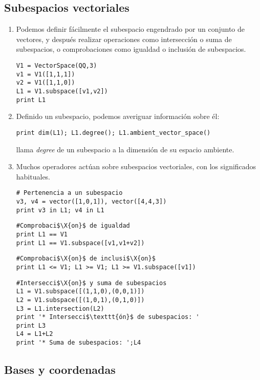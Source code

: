 \subsection{Subespacios vectoriales}\label{b3s3:index-2}
\begin{enumerate}
\item Podemos definir fácilmente el subespacio engendrado por un conjunto de
vectores, y después realizar operaciones como intersección o suma de
subespacios, o
comprobaciones como igualdad o inclusión de subespacios. 
\begin{lstlisting}
V1 = VectorSpace(QQ,3)
v1 = V1([1,1,1])
v2 = V1([1,1,0])
L1 = V1.subspace([v1,v2])
print L1
\end{lstlisting}


\item Definido un subespacio, podemos averiguar información sobre él:
\begin{lstlisting}
print dim(L1); L1.degree(); L1.ambient_vector_space()
\end{lstlisting}

{\sage} llama {\itshape degree} de un subespacio a la dimensi\'on de su espacio
ambiente.

\item Muchos operadores actúan sobre subespacios vectoriales, con los
significados
habituales.
\begin{lstlisting}
# Pertenencia a un subespacio
v3, v4 = vector([1,0,1]), vector([4,4,3])
print v3 in L1; v4 in L1
\end{lstlisting}

\begin{lstlisting}
#Comprobaci$\X{on}$ de igualdad
print L1 == V1
print L1 == V1.subspace([v1,v1+v2]) 
\end{lstlisting}

\begin{lstlisting}
#Comprobaci$\X{on}$ de inclusi$\X{on}$
print L1 <= V1; L1 >= V1; L1 >= V1.subspace([v1])
\end{lstlisting}


\begin{lstlisting}
#Intersecci$\X{on}$ y suma de subespacios
L1 = V1.subspace([(1,1,0),(0,0,1)])
L2 = V1.subspace([(1,0,1),(0,1,0)])
L3 = L1.intersection(L2)
print '* Intersecci$\texttt{ón}$ de subespacios: '
print L3
L4 = L1+L2
print '* Suma de subespacios: ';L4
\end{lstlisting}

\end{enumerate}
\subsection{Bases y coordenadas}

